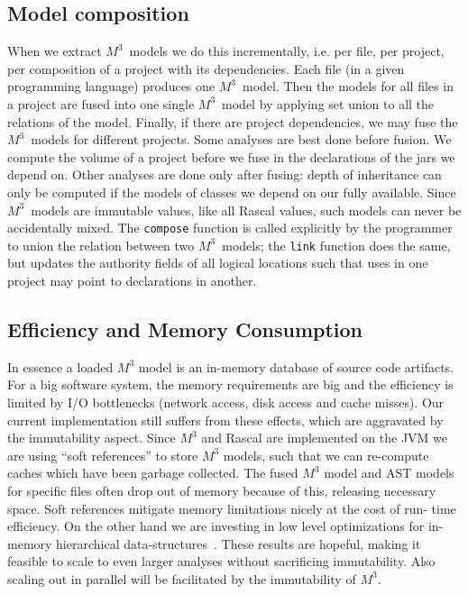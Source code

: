 \documentclass[conference]{IEEEtran}
\newcommand{\mthree}{\ensuremath{M^3}\xspace}
\begin{document}
\subsection{Model composition} When we extract \mthree\  models we do this
incrementally, i.e. per file, per project, per composition of a project with
its dependencies. Each file (in a given programming language) produces one
\mthree\  model. Then the models for all files in a project are fused into one
single \mthree\  model by applying set union to all the relations of the
model. Finally, if there are project dependencies, we may fuse the \mthree\
models for different projects.
%
Some analyses are best done before fusion. We compute the volume of a project
before we fuse in the declarations of the jars we depend on. Other analyses
are done only after fusing: depth of inheritance can only be computed if the
models of classes we depend on our fully available. Since \mthree\  models are
immutable values, like all Rascal values, such models can never be accidentally
mixed. The \texttt{compose} function is called
explicitly by the programmer to union the relation between two \mthree\ models;
the \texttt{link} function does the same, but updates the authority fields
of all logical locations such that uses in one project may point to
declarations in another.


\subsection{Efficiency and Memory Consumption}

In essence a loaded \mthree model is an in-memory database of source code
artifacts. For a big software system, the memory requirements are big and the
efficiency is limited by I/O bottlenecks (network access, disk access and
cache misses). Our current implementation still suffers from these effects,
which are aggravated by the immutability aspect.
%
Since \mthree and Rascal are implemented on the JVM we are using ``soft
references'' to store \mthree models, such that we can re-compute caches which
have been garbage collected. The fused \mthree model and AST models for
specific files often drop out of memory because of this, releasing necessary
space. Soft references mitigate memory limitations nicely at the cost of run-
time efficiency.
%
On the other hand we are investing in low level optimizations for in-memory
hierarchical data-structures~\cite{BJKO00,gpce}. These results are hopeful,
making it feasible to scale to even larger analyses without sacrificing
immutability. Also scaling out in parallel will be facilitated by the immutability of \mthree.
\end{document}
